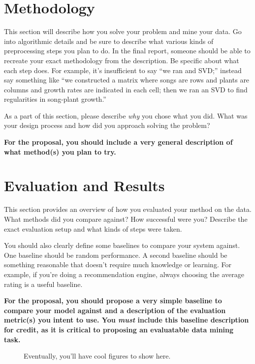 \documentclass[11pt,a4paper]{article}
\begin{document}
\section{Methodology}

This section will describe how you solve your problem and mine your data.  Go into algorithmic details and be sure to describe what various kinds of preprocessing steps you
plan to do.  In the final report, someone should be able to recreate your exact methodology from the
description.  Be specific about what each step does.  For example, it's
insufficient to say ``we ran and SVD;'' instead say something like ``we
constructed a matrix where songs are rows and plants are columns and growth rates are indicated in each cell; then we ran an SVD to find regularities in song-plant growth.''

As a part of this section, please describe \emph{why} you chose what you did.
What was your design process and how did you approach solving the problem?

\textbf{\color{red} 
For the proposal, you should include a  very general description of what method(s) you plan to try.  }


\section{Evaluation and Results}

This section provides an overview of how you evaluated your method on the data.  What methods did you compare against?  How successful were you?  Describe the exact evaluation setup and what kinds of
steps were taken.

You should also clearly define some baselines to compare your system against.
One baseline should be random performance.  A second baseline should be
something reasonable that doesn't require much knowledge or learning.  For example, if you're doing a recommendation engine, always choosing the average rating is a useful baseline.

\textbf{ \color{red} For the proposal, you should propose a very simple baseline to compare your model against and a description of the evaluation metric(s) you intent to use.  You \textit{must} include this baseline description for credit, as it is critical to  proposing an evaluatable data mining task.}


\begin{figure}
\centering
\caption{Eventually, you'll have cool figures to show here.}
\end{figure}
\end{document}
